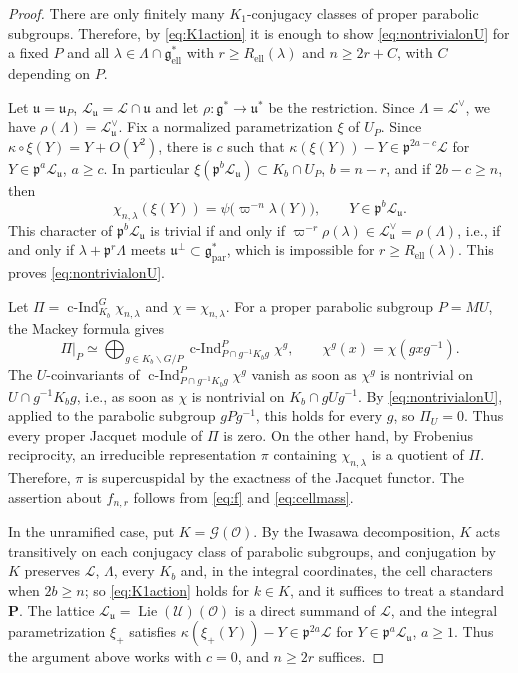 \documentclass[11pt,reqno]{amsart}
\numberwithin{equation}{section}
\theoremstyle{plain}
\theoremstyle{definition}
\theoremstyle{remark}
\theoremstyle{plain}
\newcommand{\OO}{\mathcal{O}}    %
\newcommand{\pp}{\mathfrak{p}}   %
\newcommand{\Lat}{\mathcal{L}}   %
\newcommand{\dLat}{\Lambda}      %
\newcommand{\bG}{\mathbf{G}}     %
\newcommand{\bP}{\mathbf{P}}     %
\newcommand{\g}{\mathfrak{g}}    %
\newcommand{\gd}{\mathfrak{g}^*} %
\newcommand{\uu}{\mathfrak{u}}   %
\newcommand{\Ell}[2][]{#2_{#1\mathrm{ell}}}   %
\newcommand{\Par}[2][]{#2_{#1\mathrm{par}}}
\newcommand{\cG}{\mathcal{G}}                   %
\newcommand{\cU}{\mathcal{U}}                   %
\DeclareMathOperator{\Lie}{Lie}
\DeclareMathOperator{\cInd}{c-Ind}  %
\newcommand{\erad}{R_{\mathrm{ell}}}
\newcommand{\lf}{\lambda}
\newcommand{\npar}{normalized parametrization}  %
\begin{document}
\begin{proof}
There are only finitely many $K_1$-conjugacy classes of proper parabolic subgroups.
Therefore, by \eqref{eq:K1action} it is enough to show \eqref{eq:nontrivialonU} for a fixed $P$
and all $\lf\in \dLat\cap\Ell{\gd}$ with $r\ge\erad(\lf)$ and $n\ge 2r+C$, with $C$ depending on $P$.

Let $\uu=\uu_P$, $\Lat_{\uu}=\Lat\cap\uu$ and
let $\rho:\gd\to\uu^*$ be the restriction. Since $\dLat=\Lat^\vee$, we have
$\rho(\dLat)=\Lat_{\uu}^\vee$. Fix a \npar{} $\xi$ of $U_P$. Since $\kappa\circ\xi(Y)=Y+O(Y^2)$, there is $c$ such that
$\kappa(\xi(Y))-Y\in\pp^{2a-c}\Lat$ for $Y\in\pp^a\Lat_{\uu}$,
$a\ge c$. In particular $\xi(\pp^b\Lat_{\uu})\subset K_b\cap U_P$,
$b=n-r$, and if $2b-c\ge n$, then
\[
\chi_{n,\lf}(\xi(Y))=\psi\bigl(\varpi^{-n}\lf(Y)\bigr),\qquad Y\in\pp^b\Lat_{\uu}.
\]
This character of $\pp^b\Lat_{\uu}$ is trivial if and only if
$\varpi^{-r}\rho(\lf)\in\Lat_{\uu}^\vee=\rho(\dLat)$, i.e., if and only if
$\lf+\pp^r\dLat$ meets $\uu^\perp\subset\Par{\gd}$, which is impossible for
$r\ge\erad(\lf)$. This proves \eqref{eq:nontrivialonU}.

Let $\Pi=\cInd_{K_b}^G\chi_{n,\lf}$ and $\chi=\chi_{n,\lf}$. For a proper
parabolic subgroup $P=MU$, the Mackey formula gives
\[
\Pi|_P\simeq\bigoplus_{g\in K_b\backslash G/P}\cInd_{P\cap g^{-1}K_bg}^P\chi^g,
\qquad\chi^g(x)=\chi(gxg^{-1}).
\]
The $U$-coinvariants of $\cInd_{P\cap g^{-1}K_bg}^P\chi^g$ vanish as soon as
$\chi^g$ is nontrivial on $U\cap g^{-1}K_bg$, i.e., as soon as $\chi$ is
nontrivial on $K_b\cap gUg^{-1}$. By \eqref{eq:nontrivialonU}, applied to the
parabolic subgroup $gPg^{-1}$, this holds for every $g$, so $\Pi_U=0$.
Thus every proper Jacquet module of $\Pi$ is zero. On the other hand, by Frobenius
reciprocity, an irreducible representation $\pi$ containing $\chi_{n,\lf}$
is a quotient of $\Pi$. Therefore, $\pi$ is supercuspidal by the exactness of the Jacquet functor.
The assertion about $f_{n,r}$ follows from \eqref{eq:f} and \eqref{eq:cellmass}.

In the unramified case, put $K=\cG(\OO)$. By the Iwasawa decomposition, $K$
acts transitively on each conjugacy class of parabolic subgroups, and
conjugation by $K$ preserves $\Lat$, $\dLat$, every $K_b$ and, in the integral
coordinates, the cell characters when $2b\ge n$; so \eqref{eq:K1action} holds
for $k\in K$, and it suffices to treat a standard $\bP$. The lattice
$\Lat_\uu=\Lie(\cU)(\OO)$ is a direct summand of $\Lat$, and the integral
parametrization $\xi_+$ satisfies $\kappa(\xi_+(Y))-Y\in\pp^{2a}\Lat$ for
$Y\in\pp^a\Lat_\uu$, $a\ge1$. Thus the argument above works with $c=0$, and
$n\ge2r$ suffices.
\end{proof}
\end{document}
